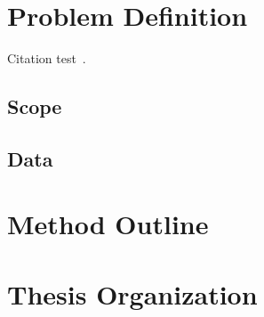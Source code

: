\section{Problem Definition}
Citation test~\parencite{latex}.

\subsection{Scope}

\subsection{Data}

\section{Method Outline}

\section{Thesis Organization}
